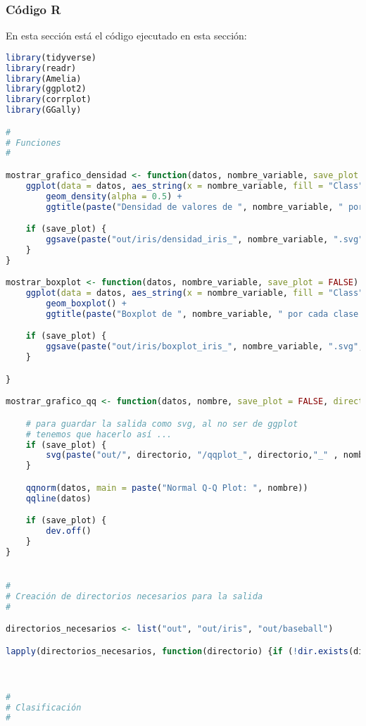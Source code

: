 \subsubsection{Código R}

En esta sección está el código ejecutado en esta sección:

\begin{lstlisting}[language=R]
library(tidyverse)
library(readr)
library(Amelia)
library(ggplot2)
library(corrplot)
library(GGally)

#
# Funciones
#

mostrar_grafico_densidad <- function(datos, nombre_variable, save_plot = FALSE) {
	ggplot(data = datos, aes_string(x = nombre_variable, fill = "Class")) +
		geom_density(alpha = 0.5) +
		ggtitle(paste("Densidad de valores de ", nombre_variable, " por cada clase."))

	if (save_plot) {
		ggsave(paste("out/iris/densidad_iris_", nombre_variable, ".svg", sep = ""), device = svg, width = 1920, height = 1080, units = "px", dpi = 150)
	}
}

mostrar_boxplot <- function(datos, nombre_variable, save_plot = FALSE) {
	ggplot(data = datos, aes_string(x = nombre_variable, fill = "Class")) +
		geom_boxplot() +
		ggtitle(paste("Boxplot de ", nombre_variable, " por cada clase."))

	if (save_plot) {
		ggsave(paste("out/iris/boxplot_iris_", nombre_variable, ".svg", sep = ""), device = svg, width = 1920, height = 1080, units = "px", dpi = 150)
	}

}

mostrar_grafico_qq <- function(datos, nombre, save_plot = FALSE, directorio = "iris") {

	# para guardar la salida como svg, al no ser de ggplot
	# tenemos que hacerlo así ...
	if (save_plot) {
		svg(paste("out/", directorio, "/qqplot_", directorio,"_" , nombre, ".svg", sep = ""))
	}

	qqnorm(datos, main = paste("Normal Q-Q Plot: ", nombre))
	qqline(datos)

	if (save_plot) {
		dev.off()
	}
}


#
# Creación de directorios necesarios para la salida
#

directorios_necesarios <- list("out", "out/iris", "out/baseball")

lapply(directorios_necesarios, function(directorio) {if (!dir.exists(directorio)) dir.create(directorio) })



#
# Clasificación
#



\end{lstlisting}
